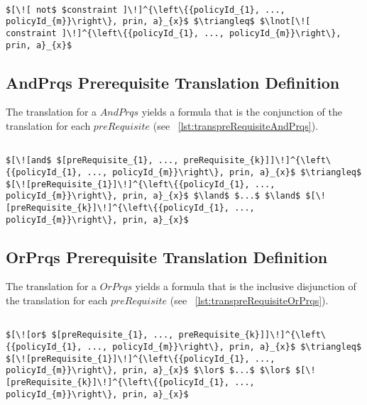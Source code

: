 \lstset{mathescape, language=AST}  
\begin{lstlisting}[frame=single, caption={Prerequisite Translation Definition {$\colon$} Not Constraint},label={lst:transpreRequisiteNotConstraint}]

$[\![ not$ $constraint ]\!]^{\left\{{policyId_{1}, ..., policyId_{m}}\right\}, prin, a}_{x}$ $\triangleq$ $\lnot[\![ constraint ]\!]^{\left\{{policyId_{1}, ..., policyId_{m}}\right\}, prin, a}_{x}$ 
\end{lstlisting}

\subsection{AndPrqs Prerequisite Translation Definition}
The translation for a $AndPrqs$ yields a formula that is the conjunction of the translation for each $preRequisite$ (see ~\ref{lst:transpreRequisiteAndPrqs}).

\lstset{mathescape, language=AST}  
\begin{lstlisting}[frame=single, caption={Prerequisite Translation Definition {$\colon$} Conjunction },label={lst:transpreRequisiteAndPrqs}]

$[\![and$ $[preRequisite_{1}, ..., preRequisite_{k}]]\!]^{\left\{{policyId_{1}, ..., policyId_{m}}\right\}, prin, a}_{x}$ $\triangleq$ $[\![preRequisite_{1}]\!]^{\left\{{policyId_{1}, ..., policyId_{m}}\right\}, prin, a}_{x}$ $\land$ $...$ $\land$ $[\![preRequisite_{k}]\!]^{\left\{{policyId_{1}, ..., policyId_{m}}\right\}, prin, a}_{x}$

\end{lstlisting}

\subsection{OrPrqs Prerequisite Translation Definition}
The translation for a $OrPrqs$ yields a formula that is the inclusive disjunction of the translation for each $preRequisite$ (see ~\ref{lst:transpreRequisiteOrPrqs}).

\lstset{mathescape, language=AST}  
\begin{lstlisting}[frame=single, caption={Prerequisite Translation Definition {$\colon$} Inclusive Disjunction},label={lst:transpreRequisiteOrPrqs}]

$[\![or$ $[preRequisite_{1}, ..., preRequisite_{k}]]\!]^{\left\{{policyId_{1}, ..., policyId_{m}}\right\}, prin, a}_{x}$ $\triangleq$ $[\![preRequisite_{1}]\!]^{\left\{{policyId_{1}, ..., policyId_{m}}\right\}, prin, a}_{x}$ $\lor$ $...$ $\lor$ $[\![preRequisite_{k}]\!]^{\left\{{policyId_{1}, ..., policyId_{m}}\right\}, prin, a}_{x}$

\end{lstlisting}

